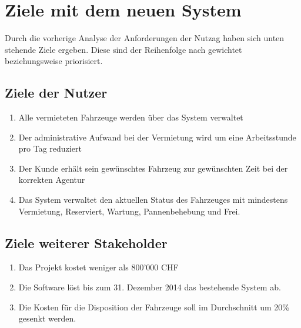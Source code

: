 \section{Ziele mit dem neuen System}
Durch die vorherige Analyse der Anforderungen der Nutzag haben sich unten stehende Ziele ergeben. Diese sind der Reihenfolge nach gewichtet beziehungsweise priorisiert.

\subsection{Ziele der Nutzer}
\begin{enumerate}
\item Alle vermieteten Fahrzeuge werden über das System verwaltet
\item Der administrative Aufwand bei der Vermietung wird um eine Arbeitsstunde pro Tag reduziert
\item Der Kunde erhält sein gewünschtes Fahrzeug zur gewünschten Zeit bei der korrekten Agentur
\item Das System verwaltet den aktuellen Status des Fahrzeuges mit mindestens Vermietung, Reserviert, Wartung, Pannenbehebung und Frei.
\end{enumerate} 
%
\subsection{Ziele weiterer Stakeholder}
\begin{enumerate}
\item Das Projekt kostet weniger als 800'000 CHF
\item Die Software löst bis zum 31. Dezember 2014 das bestehende System ab.
\item Die Kosten für die Disposition der Fahrzeuge soll im Durchschnitt um 20\% gesenkt werden.
\end{enumerate}